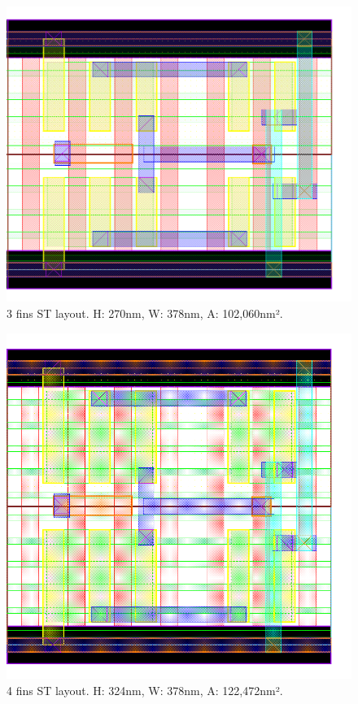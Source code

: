 \documentclass[pgmicro,diss,english]{iiufrgs}
\begin{document}
\begin{figure}[]
\centering
\includegraphics[width=\textwidth,height=\textheight,keepaspectratio]{ST3F.png}
\caption{3 fins ST layout. H: 270nm, W: 378nm, A: 102,060nm².}
\label{fig:ST3F}
\end{figure}

\begin{figure}[]
\centering
\includegraphics[width=\textwidth,height=\textheight,keepaspectratio]{ST4F.png}
\caption{4 fins ST layout.  H: 324nm, W: 378nm, A: 122,472nm².}
\label{fig:ST4F}
\end{figure}
\end{document}
